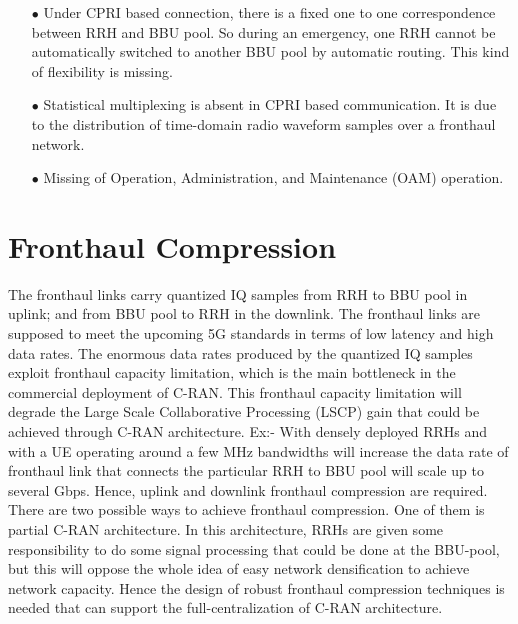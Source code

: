 \begin{multicols}{2}
\begin{itemize}
\begin{itemize}
\item[$\bullet$]  Under CPRI based connection, there is a fixed one to one correspondence between RRH and BBU pool. So during an emergency, one RRH cannot be automatically switched to another BBU pool by automatic routing. This kind of flexibility is missing. 

\item[$\bullet$] Statistical multiplexing is absent in CPRI based communication. It is due to the distribution of time-domain radio waveform samples over a fronthaul network.

\item[$\bullet$] Missing of Operation, Administration, and Maintenance (OAM) operation.

\end{itemize}
\end{itemize}

\section{Fronthaul Compression}\label{sect06}

The fronthaul links carry quantized IQ samples from RRH to BBU pool in uplink; and from BBU pool to RRH in the downlink. The fronthaul links are supposed to meet the upcoming 5G standards in terms of low latency and high data rates. The enormous data rates produced by the quantized IQ samples exploit fronthaul capacity limitation, which is the main bottleneck in the commercial deployment of C-RAN. This fronthaul capacity limitation will degrade the Large Scale Collaborative Processing (LSCP) gain that could be achieved through C-RAN architecture. Ex:- With densely deployed RRHs and with a UE operating around a few MHz bandwidths will increase the data rate of fronthaul link that connects the particular RRH to BBU pool will scale up to several Gbps. Hence, uplink and downlink fronthaul compression are required. There are two possible ways to achieve fronthaul compression. One of them is partial C-RAN architecture. In this architecture, RRHs are given some responsibility to do some signal processing that could be done at the BBU-pool, but this will oppose the whole idea of easy network densification to achieve network capacity. Hence the design of robust fronthaul compression techniques is needed that can support the full-centralization of C-RAN architecture.


\end{multicols}
